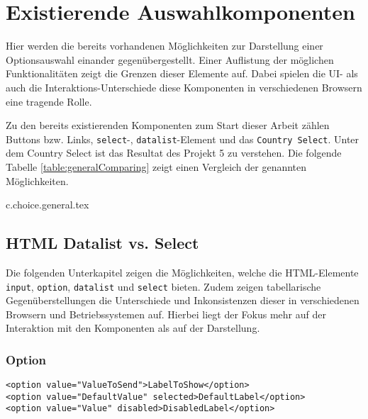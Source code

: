\chapter{Existierende Auswahlkomponenten}
\label{chap:existingComponents}


Hier werden die bereits vorhandenen Möglichkeiten zur Darstellung einer Optionsauswahl einander gegenübergestellt.
Einer Auflistung der möglichen Funktionalitäten zeigt die Grenzen dieser Elemente auf.
Dabei spielen die UI- als auch die Interaktions-Unterschiede diese Komponenten in verschiedenen Browsern eine tragende Rolle.

Zu den bereits existierenden Komponenten zum Start dieser Arbeit zählen Buttons bzw. Links, \texttt{select}-, \texttt{datalist}-Element und das \texttt{Country Select}.
Unter dem Country Select ist das Resultat des Projekt 5 zu verstehen.
Die folgende Tabelle \ref{table:generalComparing} zeigt einen Vergleich der genannten Möglichkeiten.

{c.choice.general.tex}


\section{HTML Datalist vs. Select}
\label{sec:datalistSelect}

Die folgenden Unterkapitel zeigen die Möglichkeiten, welche die HTML-Elemente \texttt{input}, \texttt{option}, \texttt{datalist} und \texttt{select} bieten.
Zudem zeigen tabellarische Gegenüberstellungen die Unterschiede und Inkonsistenzen dieser in verschiedenen Browsern und Betriebssystemen auf.
Hierbei liegt der Fokus mehr auf der Interaktion mit den Komponenten als auf der Darstellung.


\subsection{Option}
\label{sec:option}

\begin{lstlisting}[style = htmlcssjs, caption = Option Example, label = code:OptionExample]
<option value="ValueToSend">LabelToShow</option>
<option value="DefaultValue" selected>DefaultLabel</option>
<option value="Value" disabled>DisabledLabel</option>
\end{lstlisting}

